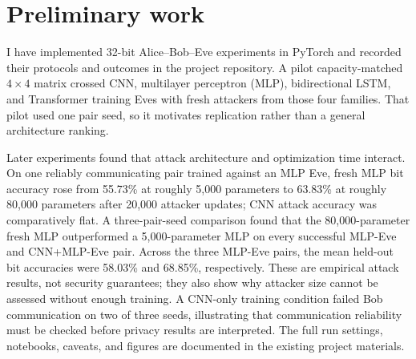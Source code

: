 \documentclass[10pt,letterpaper]{article}
\begin{document}
\section{Preliminary work}
I have implemented 32-bit Alice--Bob--Eve experiments in PyTorch and recorded their protocols and outcomes in the project repository. A pilot capacity-matched $4\times4$ matrix crossed CNN, multilayer perceptron (MLP), bidirectional LSTM, and Transformer training Eves with fresh attackers from those four families. That pilot used one pair seed, so it motivates replication rather than a general architecture ranking.

Later experiments found that attack architecture and optimization time interact. On one reliably communicating pair trained against an MLP Eve, fresh MLP bit accuracy rose from 55.73\% at roughly 5,000 parameters to 63.83\% at roughly 80,000 parameters after 20,000 attacker updates; CNN attack accuracy was comparatively flat. A three-pair-seed comparison found that the 80,000-parameter fresh MLP outperformed a 5,000-parameter MLP on every successful MLP-Eve and CNN+MLP-Eve pair. Across the three MLP-Eve pairs, the mean held-out bit accuracies were 58.03\% and 68.85\%, respectively. These are empirical attack results, not security guarantees; they also show why attacker size cannot be assessed without enough training. A CNN-only training condition failed Bob communication on two of three seeds, illustrating that communication reliability must be checked before privacy results are interpreted. The full run settings, notebooks, caveats, and figures are documented in the existing project materials.
\end{document}
